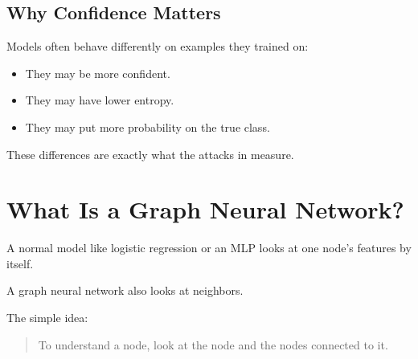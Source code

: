 \documentclass[11pt,a4paper]{article}
\newcommand{\code}[1]{\texttt{\detokenize{#1}}}
\begin{document}
\subsection{Why Confidence Matters}

Models often behave differently on examples they trained on:
\begin{itemize}
  \item They may be more confident.
  \item They may have lower entropy.
  \item They may put more probability on the true class.
\end{itemize}

These differences are exactly what the attacks in \code{attacks.py} measure.

\section{What Is a Graph Neural Network?}

A normal model like logistic regression or an MLP looks at one node's features by itself.

A graph neural network also looks at neighbors.

The simple idea:

\begin{quote}
To understand a node, look at the node and the nodes connected to it.
\end{quote}

\begin{center}
\end{center}
\end{document}
